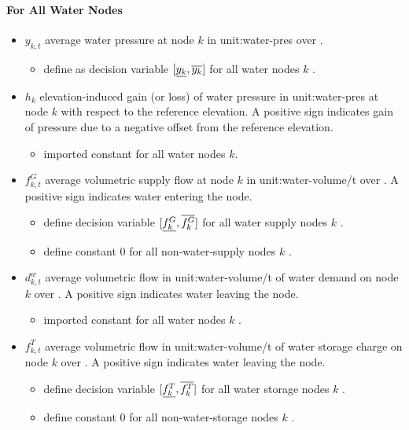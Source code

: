 \paragraph{For All Water Nodes}
\begin{itemize}

\item $y_{k,t}$ average water pressure at node $k$ in \gls{unit:water-pres}
over \intervaloft{}.
\begin{itemize}
\item \gls{define} as decision variable $[\underline{y_k}, \overline{y_k}]$ for all water
nodes $k$ \atallt{}.
\end{itemize}

\item $h_k$ elevation-induced gain (or loss) of water pressure
in \gls{unit:water-pres} at node $k$ with respect to the reference elevation. A
positive sign indicates gain of pressure due to a negative offset from the
reference elevation.
\begin{itemize}
\item \gls{imported} constant for all water nodes $k$.
\end{itemize}


\item $f^G_{k,t}$ average volumetric supply flow at node $k$ in
  \gls{unit:water-volume/t} over \intervaloft{}. A positive sign indicates water
  entering the node.
  \begin{itemize}
  \item \gls{define} decision variable $[\underline{f^G_k}, \overline{f^G_k}]$ for all water
    supply nodes $k$ \atallt{}.
  \item \gls{define} constant $0$ for all non-water-supply nodes $k$ \atallt{}.
  \end{itemize}

\item $d^w_{k,t}$ average volumetric flow in \gls{unit:water-volume/t} of water
  demand on node $k$ over \intervaloft{}. A positive sign indicates water
  leaving the node.
  \begin{itemize}
  \item \gls{imported} constant for all water nodes $k$ \atallt{}.
  \end{itemize}


\item $f^T_{k,t}$ average volumetric flow in \gls{unit:water-volume/t} of water
  storage charge on node $k$ over \intervaloft{}. A positive sign indicates
  water leaving the node.

  \begin{itemize}
  \item \gls{define} decision variable $[\underline{f^T_k}, \overline{f^T_k}]$ for all water
    storage nodes $k$ \atallt{}.

  \item \gls{define} constant $0$ for all non-water-storage nodes $k$ \atallt{}.
  \end{itemize}

\end{itemize}
